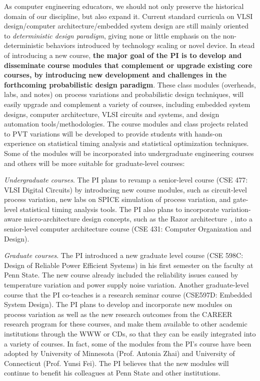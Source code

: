 As computer engineering educators, we should not only preserve the
historical domain of our discipline, but also expand it. Current
standard curricula on VLSI design/computer architecture/embedded
system design are still mainly oriented to {\it deterministic
design paradigm}, giving none or little emphasis on the
non-deterministic behaviors introduced by technology scaling or
novel device. In stead of introducing a new course, {\bf the major
goal of the PI is to develop and disseminate course modules that
complement or upgrade existing core courses, by introducing new
development and challenges in the forthcoming probabilistic design
paradigm}. These class modules (overheads, labs, and notes) on
process variations and probabilistic design techniques, will
easily upgrade and complement a variety of courses, including
embedded system designs, computer architecture, VLSI circuits and
systems, and design automation tools/methodologies. The course
modules and class projects related to PVT variations will be
developed to provide students with hands-on experience on
statistical timing analysis and statistical optimization
techniques. Some of the modules will be incorporated into
undergraduate engineering courses and others will be more suitable
for graduate-level courses:
    \squishlist
      \item {\it Undergraduate courses}. The PI plans to revamp a
      senior-level course (CSE 477: VLSI Digital Circuits) by
      introducing new course modules, such as circuit-level process
      variation, new labs on SPICE simulation of process
      variation, and gate-level statistical timing analysis tools.
      The PI also plans to incorporate variation-aware
      micro-architecture design concepts, such as the Razor
      architecture~\cite{PV:razor}, into a senior-level computer
      architecture course (CSE 431: Computer Organization and
      Design).
      \item{\it Graduate courses}. The PI introduced a new
      graduate level course (CSE 598C: Design of Reliable Power
      Efficient Systems) in his first semester on the faculty at
      Penn State.
      The new course already included the reliability
      issues caused by temperature variation and power supply
      noise variation.  Another graduate-level course that the PI
      co-teaches is a research seminar course (CSE597D: Embedded
      System Design).
      The PI plans to develop and incorporate new modules on
      process variation as well as the new research outcomes from
      the CAREER research program for these courses, and make them available to
      other academic institutions through the WWW or CDs, so that
      they can be easily integrated into a variety of courses. In fact,
      some of the modules from
      the PI's course have been adopted by University of
      Minnesota (Prof. Antonia Zhai) and University of Connecticut
      (Prof. Yunsi Fei). The PI believes that the new modules will
      continue to
      benefit his colleagues at Penn State and other institutions.
      \squishend

